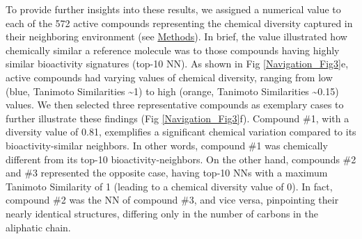 To provide further insights into these results, we assigned a numerical value to each of the 572 active compounds representing the chemical diversity captured in their neighboring environment (see \hyperref[Navigation_Methods]{Methods}). In brief, the value illustrated how chemically similar a reference molecule was to those compounds having highly similar bioactivity signatures (top-10 NN). As shown in Fig \ref{Navigation_Fig3}e, active compounds had varying values of chemical diversity, ranging from low (blue, Tanimoto Similarities \textasciitilde 1) to high (orange, Tanimoto Similarities \textasciitilde 0.15) values. We then selected three representative compounds as exemplary cases to further illustrate these findings (Fig \ref{Navigation_Fig3}f). Compound \#1, with a diversity value of 0.81, exemplifies a significant chemical variation compared to its bioactivity-similar neighbors. In other words, compound \#1 was chemically different from its top-10 bioactivity-neighbors. On the other hand, compounds \#2 and \#3 represented the opposite case, having top-10 NNs with a maximum Tanimoto Similarity of 1 (leading to a chemical diversity value of 0). In fact, compound \#2 was the NN of compound \#3, and vice versa, pinpointing their nearly identical structures, differing only in the number of carbons in the aliphatic chain. 



